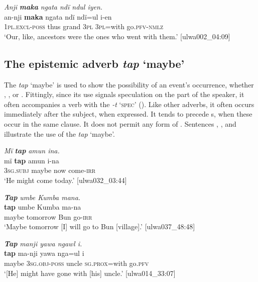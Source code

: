 \ea%
    \label{ex:otherwc:124}
          \textit{Anji} \textbf{\textit{maka}} \textit{ngata ndï ndul iyen.}\\
\gll    an-nji        \textbf{maka}  ngata  ndï  ndï=ul    i-en\\
    1\textsc{pl.excl-poss}  thus  grand  \textsc{3pl}  3\textsc{pl}=with  go.\textsc{pfv-nmlz}\\
\glt `Our, like, ancestors were the ones who went with them.’ [ulwa002\_04:09]
\z

\subsection{{The} {epistemic} {adverb} {\textit{tap}} {‘maybe’}}\label{sec:8.2.4}


The  \textit{tap} ‘maybe’ is used to show the possibility of an event’s occurrence, whether , , or . Fittingly, since its use signals speculation on the part of the speaker, it often accompanies a verb with the   \textit{-t} ‘\textsc{spec}’ (). Like other adverbs, it often occurs immediately after the subject, when expressed. It tends to precede s, when these occur in the same clause. It does not permit any form of . Sentences , , and  illustrate the use of the  \textit{tap} ‘maybe’.

\ea%
    \label{ex:otherwc:125}
          \textit{Mï} \textbf{\textit{tap}} \textit{amun ina.}\\
\gll    mï      \textbf{tap}    amun  i-na\\
    3\textsc{sg.subj}  maybe  now  come-\textsc{irr}\\
\glt `He might come today.’ [ulwa032\_03:44]
\z

\ea%
    \label{ex:otherwc:126}
          \textbf{\textit{Tap}} \textit{umbe Kumba mana.}\\
\gll    \textbf{tap}    umbe    Kumba  ma-na\\
    maybe  tomorrow  Bun  go-\textsc{irr}\\
\glt `Maybe tomorrow [I] will go to Bun [village].’ [ulwa037\_48:48]
\z

\ea%
    \label{ex:otherwc:127}
          \textbf{\textit{Tap}} \textit{manji yawa ngawl i.}\\
\gll    \textbf{tap}    ma-nji      yawa  nga=ul      i\\
    maybe  3\textsc{sg.obj-poss}  uncle  \textsc{sg.prox}=with  go.\textsc{pfv}\\
\glt `[He] might have gone with [his] uncle.’ [ulwa014\_33:07]
\z

